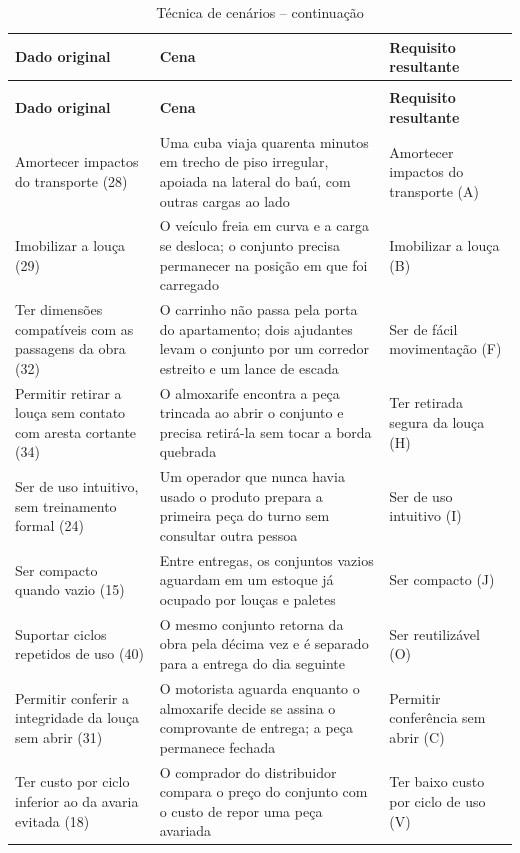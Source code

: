 \footnotesize
\begin{longtable}{@{}L{3.1cm}@{\hspace{0.3cm}}L{6.4cm}@{\hspace{0.3cm}}L{4.7cm}@{}}
\caption{Matriz de transformação de dados originais em requisitos}\label{tab:cenarios}\\
\toprule
\textbf{Dado original} & \textbf{Cena} & \textbf{Requisito resultante} \\
\midrule
\endfirsthead
\caption[]{Técnica de cenários -- continuação}\\
\toprule
\textbf{Dado original} & \textbf{Cena} & \textbf{Requisito resultante} \\
\midrule
\endhead
Amortecer impactos do transporte (28) & Uma cuba viaja quarenta minutos em trecho de piso irregular, apoiada na lateral do baú, com outras cargas ao lado & Amortecer impactos do transporte (A) \\
Imobilizar a louça (29) & O veículo freia em curva e a carga se desloca; o conjunto precisa permanecer na posição em que foi carregado & Imobilizar a louça (B) \\
Ter dimensões compatíveis com as passagens da obra (32) & O carrinho não passa pela porta do apartamento; dois ajudantes levam o conjunto por um corredor estreito e um lance de escada & Ser de fácil movimentação (F) \\
Permitir retirar a louça sem contato com aresta cortante (34) & O almoxarife encontra a peça trincada ao abrir o conjunto e precisa retirá-la sem tocar a borda quebrada & Ter retirada segura da louça (H) \\
Ser de uso intuitivo, sem treinamento formal (24) & Um operador que nunca havia usado o produto prepara a primeira peça do turno sem consultar outra pessoa & Ser de uso intuitivo (I) \\
Ser compacto quando vazio (15) & Entre entregas, os conjuntos vazios aguardam em um estoque já ocupado por louças e paletes & Ser compacto (J) \\
Suportar ciclos repetidos de uso (40) & O mesmo conjunto retorna da obra pela décima vez e é separado para a entrega do dia seguinte & Ser reutilizável (O) \\
Permitir conferir a integridade da louça sem abrir (31) & O motorista aguarda enquanto o almoxarife decide se assina o comprovante de entrega; a peça permanece fechada & Permitir conferência sem abrir (C) \\
Ter custo por ciclo inferior ao da avaria evitada (18) & O comprador do distribuidor compara o preço do conjunto com o custo de repor uma peça avariada & Ter baixo custo por ciclo de uso (V) \\

\end{longtable}
